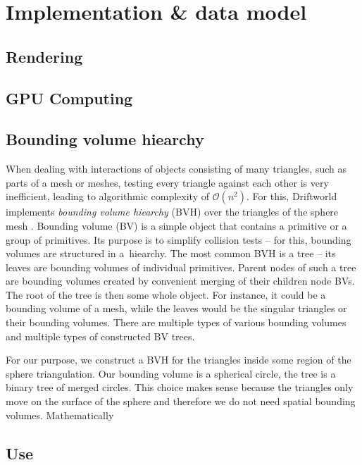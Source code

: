 \section{Implementation \& data model}
\label{sec:implementation}
\subsection{Rendering}
\label{subsec:rendering}
\subsection{GPU Computing}
\subsection{Bounding volume hiearchy}
\label{subsec:bvh}
When dealing with interactions of objects consisting of many triangles, such as parts of a mesh or meshes, testing every triangle against each other is very inefficient, leading to algorithmic complexity of $\mathcal{O}(n^2)$. For this, Driftworld implements \textit{bounding volume hiearchy} (BVH) over the triangles of the sphere mesh \cite{sulaiman}. Bounding volume (BV) is a simple object that contains a primitive or a group of primitives. Its purpose is to simplify collision tests -- for this, bounding volumes are structured in a~hiearchy. The most common BVH is a tree -- its leaves are bounding volumes of individual primitives. Parent nodes of such a tree are bounding volumes created by convenient merging of their children node BVs. The root of the tree is then some whole object. For instance, it could be a bounding volume of a mesh, while the leaves would be the singular triangles or their bounding volumes. There are multiple types of various bounding volumes and multiple types of constructed BV trees.

For our purpose, we construct a BVH for the triangles inside some region of the sphere triangulation. Our bounding volume is a spherical circle, the tree is a binary tree of merged circles. This choice makes sense because the triangles only move on the surface of the sphere and therefore we do not need spatial bounding volumes. Mathematically
\subsection{Use}
